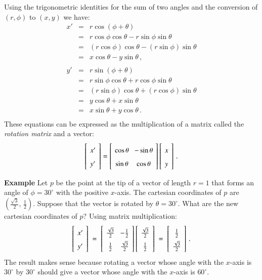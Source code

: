 Using the trigonometric identities for the sum of two angles and the conversion of $(r,\phi)$ to $(x,y)$ we have:
\begin{eqnarray*}
x' &=& r\cos(\phi+\theta)\\
&=&r\cos\phi\cos\theta - r\sin\phi\sin\theta\\
&=&(r\cos\phi)\cos\theta - (r\sin\phi)\sin\theta\\
&=&x\cos\theta - y\sin\theta\,,\\
\\
y' &=& r\sin(\phi+\theta)\\
&=&r\sin\phi\cos\theta + r\cos\phi\sin\theta\\
&=&(r\sin\phi)\cos\theta + (r\cos\phi)\sin\theta\\
&=&y\cos\theta + x\sin\theta\\
&=&x\sin\theta + y\cos\theta\,.\\
\end{eqnarray*}
These equations can be expressed as the multiplication of a matrix called the \emph{rotation matrix} and a vector:
\[
\spacearray
\left[\begin{array}{c}x'\\y'\end{array}\right]=
\left[\begin{array}{cc}\cos\theta&-\sin\theta\\\sin\theta&\cos\theta\end{array}\right]
\left[\begin{array}{c}x\\y\end{array}\right]\,.
\]

\medskip

\noindent\textbf{Example} Let $p$ be the point at the tip of a vector of length $r=1$ that forms an angle of $\phi=30^{\circ}$ with the positive $x$-axis. The cartesian coordinates of $p$ are $\left(\frac{\sqrt{3}}{2},\,\frac{1}{2}\right)$. Suppose that the vector is rotated by $\theta=30^{\circ}$. What are the new cartesian coordinates of $p$? Using matrix multiplication:
\[
\spacearray
\left[\begin{array}{c}x'\\y'\end{array}\right]\;=\;
\left[\begin{array}{cc}\frac{\sqrt{3}}{2}&-\frac{1}{2}\\\frac{1}{2}&\frac{\sqrt{3}}{2}\end{array}\right]
\left[\begin{array}{c}\frac{\sqrt{3}}{2}\\\frac{1}{2}\end{array}\right]\;=\;
\left[\begin{array}{c}\frac{1}{2}\\\frac{\sqrt{3}}{2}\end{array}\right]\,.
\]
The result makes sense because rotating a vector whose angle with the $x$-axis is $30^{\circ}$ by $30^{\circ}$ should give a vector whose angle with the $x$-axis is $60^{\circ}$.


